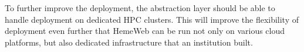 \begin{enumerate}
    To further improve the deployment, the abstraction layer should be able to handle deployment on dedicated HPC clusters. This will improve the flexibility of deployment even further that HemeWeb can be run not only on various cloud platforms, but also dedicated infrastructure that an institution built.
    
\end{enumerate}

